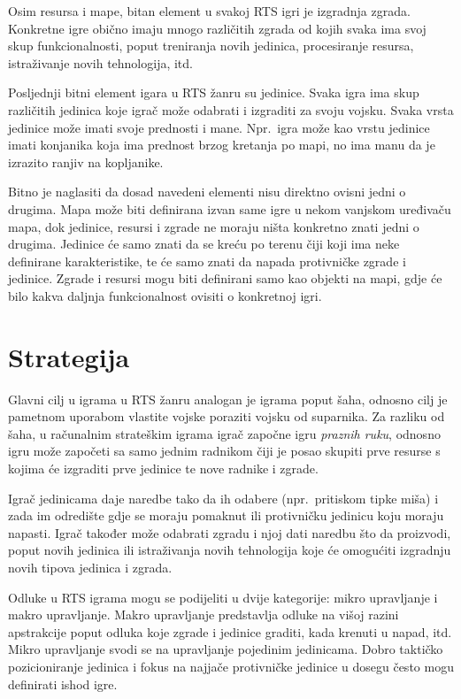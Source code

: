 \documentclass[times, utf8, zavrsni, numeric]{fer}
\begin{document}
\par Osim resursa i mape, bitan element u svakoj RTS igri je izgradnja zgrada. 
Konkretne igre obično imaju mnogo različitih zgrada od kojih svaka ima svoj skup funkcionalnosti, poput treniranja novih jedinica, procesiranje resursa, istraživanje novih tehnologija, itd.  

\par Posljednji bitni element igara u RTS žanru su jedinice. 
Svaka igra ima skup različitih jedinica koje igrač može odabrati i izgraditi za svoju vojsku.
Svaka vrsta jedinice može imati svoje prednosti i mane.
Npr.\ igra može kao vrstu jedinice imati konjanika koja ima prednost brzog kretanja po mapi, no ima manu da je izrazito ranjiv na kopljanike.

\par Bitno je naglasiti da dosad navedeni elementi nisu direktno ovisni jedni o drugima.
Mapa može biti definirana izvan same igre u nekom vanjskom uređivaču mapa, dok jedinice, resursi i zgrade ne moraju ništa konkretno znati jedni o drugima.
Jedinice će samo znati da se kreću po terenu čiji koji ima neke definirane karakteristike, te će samo znati da napada protivničke zgrade i jedinice. 
Zgrade i resursi mogu biti definirani samo kao objekti na mapi, gdje će bilo kakva daljnja funkcionalnost ovisiti o konkretnoj igri.

\section{Strategija}

\par Glavni cilj u igrama u RTS žanru analogan je igrama poput šaha, odnosno cilj je pametnom uporabom vlastite vojske poraziti vojsku od suparnika. 
Za razliku od šaha, u računalnim strateškim igrama igrač započne igru \textit{praznih ruku}, odnosno igru može započeti sa samo jednim radnikom čiji je posao skupiti prve resurse s kojima će izgraditi prve jedinice te nove radnike i zgrade.

\par Igrač jedinicama daje naredbe tako da ih odabere (npr.\ pritiskom tipke miša) i zada im odredište gdje se moraju pomaknut ili protivničku jedinicu koju moraju napasti. 
Igrač također može odabrati zgradu i njoj dati naredbu što da proizvodi, poput novih jedinica ili istraživanja novih tehnologija koje će omogućiti izgradnju novih tipova jedinica i zgrada.

\par Odluke u RTS igrama mogu se podijeliti u dvije kategorije: mikro upravljanje i makro upravljanje. 
Makro upravljanje predstavlja odluke na višoj razini apstrakcije poput odluka koje zgrade i jedinice graditi, kada krenuti u napad, itd. 
Mikro upravljanje svodi se na upravljanje pojedinim jedinicama.
Dobro taktičko pozicioniranje jedinica i fokus na najjače protivničke jedinice u dosegu često mogu definirati ishod igre.\cite{article:HybridPathdinding}
\end{document}
